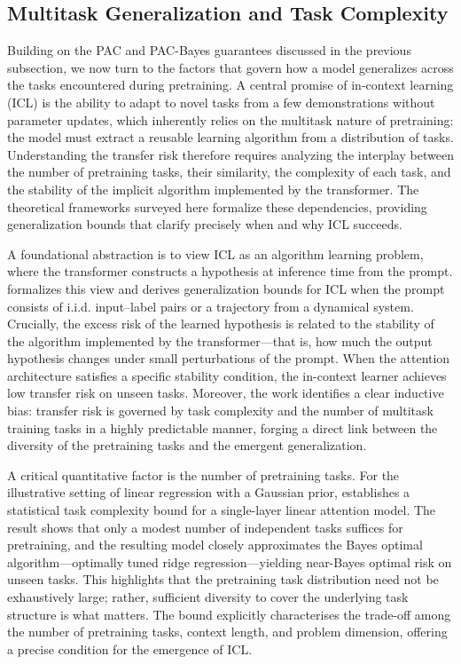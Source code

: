 \documentclass[11pt]{article}
\begin{document}
\subsection{Multitask Generalization and Task Complexity}

Building on the PAC and PAC-Bayes guarantees discussed in the previous subsection, we now turn to the factors that govern how a model generalizes across the tasks encountered during pretraining. A central promise of in-context learning (ICL) is the ability to adapt to novel tasks from a few demonstrations without parameter updates, which inherently relies on the multitask nature of pretraining: the model must extract a reusable learning algorithm from a distribution of tasks. Understanding the transfer risk therefore requires analyzing the interplay between the number of pretraining tasks, their similarity, the complexity of each task, and the stability of the implicit algorithm implemented by the transformer. The theoretical frameworks surveyed here formalize these dependencies, providing generalization bounds that clarify precisely when and why ICL succeeds.

A foundational abstraction is to view ICL as an algorithm learning problem, where the transformer constructs a hypothesis at inference time from the prompt. \cite{ref4} formalizes this view and derives generalization bounds for ICL when the prompt consists of i.i.d. input--label pairs or a trajectory from a dynamical system. Crucially, the excess risk of the learned hypothesis is related to the stability of the algorithm implemented by the transformer---that is, how much the output hypothesis changes under small perturbations of the prompt. When the attention architecture satisfies a specific stability condition, the in-context learner achieves low transfer risk on unseen tasks. Moreover, the work identifies a clear inductive bias: transfer risk is governed by task complexity and the number of multitask training tasks in a highly predictable manner, forging a direct link between the diversity of the pretraining tasks and the emergent generalization.

A critical quantitative factor is the number of pretraining tasks. For the illustrative setting of linear regression with a Gaussian prior, \cite{ref26} establishes a statistical task complexity bound for a single-layer linear attention model. The result shows that only a modest number of independent tasks suffices for pretraining, and the resulting model closely approximates the Bayes optimal algorithm---optimally tuned ridge regression---yielding near-Bayes optimal risk on unseen tasks. This highlights that the pretraining task distribution need not be exhaustively large; rather, sufficient diversity to cover the underlying task structure is what matters. The bound explicitly characterises the trade-off among the number of pretraining tasks, context length, and problem dimension, offering a precise condition for the emergence of ICL.
\end{document}
